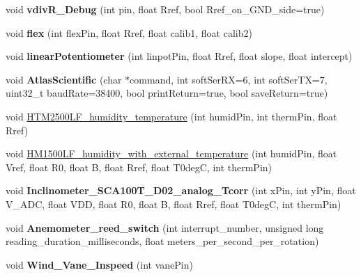 \begin{DoxyCompactItemize}
\item 
void {\bfseries vdiv\+R\+\_\+\+Debug} (int pin, float Rref, bool Rref\+\_\+on\+\_\+\+G\+N\+D\+\_\+side=true)\hypertarget{classLogger_a8d318b089ca5fc2c3079f17c8495527a}{}\label{classLogger_a8d318b089ca5fc2c3079f17c8495527a}

\item 
void {\bfseries flex} (int flex\+Pin, float Rref, float calib1, float calib2)\hypertarget{classLogger_a75a7e7b6833aac586436198173137ad5}{}\label{classLogger_a75a7e7b6833aac586436198173137ad5}

\item 
void {\bfseries linear\+Potentiometer} (int linpot\+Pin, float Rref, float slope, float intercept)\hypertarget{classLogger_a7bd8c5c0c3240c8624ab71784ee1ef35}{}\label{classLogger_a7bd8c5c0c3240c8624ab71784ee1ef35}

\item 
void {\bfseries Atlas\+Scientific} (char $\ast$command, int soft\+Ser\+RX=6, int soft\+Ser\+TX=7, uint32\+\_\+t baud\+Rate=38400, bool print\+Return=true, bool save\+Return=true)\hypertarget{classLogger_a9fdcbb56e3e4910ac895ee150fe1b9ed}{}\label{classLogger_a9fdcbb56e3e4910ac895ee150fe1b9ed}

\item 
void \hyperlink{classLogger_a796603ef13ff8264574c9ac181fca0a4}{H\+T\+M2500\+L\+F\+\_\+humidity\+\_\+temperature} (int humid\+Pin, int therm\+Pin, float Rref)
\item 
void \hyperlink{classLogger_abf1b1f04c10ec9622e83d23c7e71db62}{H\+M1500\+L\+F\+\_\+humidity\+\_\+with\+\_\+external\+\_\+temperature} (int humid\+Pin, float Vref, float R0, float B, float Rref, float T0degC, int therm\+Pin)
\item 
void {\bfseries Inclinometer\+\_\+\+S\+C\+A100\+T\+\_\+\+D02\+\_\+analog\+\_\+\+Tcorr} (int x\+Pin, int y\+Pin, float V\+\_\+\+A\+DC, float V\+DD, float R0, float B, float Rref, float T0degC, int therm\+Pin)\hypertarget{classLogger_a9370d0cb9d503ccf0a43983dff943be8}{}\label{classLogger_a9370d0cb9d503ccf0a43983dff943be8}

\item 
void {\bfseries Anemometer\+\_\+reed\+\_\+switch} (int interrupt\+\_\+number, unsigned long reading\+\_\+duration\+\_\+milliseconds, float meters\+\_\+per\+\_\+second\+\_\+per\+\_\+rotation)\hypertarget{classLogger_a3b2c1d7e8f475892bd411cb806af3fae}{}\label{classLogger_a3b2c1d7e8f475892bd411cb806af3fae}

\item 
void {\bfseries Wind\+\_\+\+Vane\+\_\+\+Inspeed} (int vane\+Pin)\hypertarget{classLogger_a31c3cba5ff5722fb66bf540bfbe8b25d}{}\label{classLogger_a31c3cba5ff5722fb66bf540bfbe8b25d}


\end{DoxyCompactItemize}
